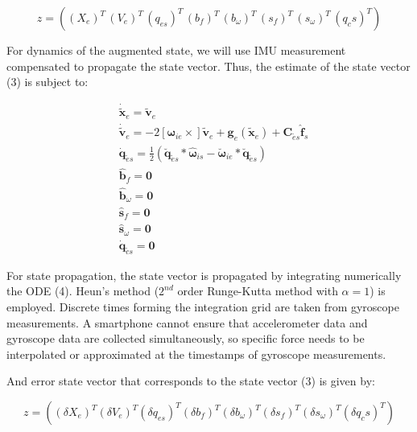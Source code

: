 \documentclass[conference]{IEEEtran}
\begin{document}
\begin{equation}
z = ((X_e)^T \, (V_e)^T \, (q_{es})^T \, (b_f)^T \, (b_{\omega})^T \, (s_f)^T \, (s_{\omega})^T \, (q_cs)^T)
\end{equation}

For dynamics of the augmented state, we will use IMU measurement compensated to propagate the state vector. Thus, the estimate of the state vector (3) is subject to:

\begin{equation}
\begin{aligned}
& \dot{\tilde{\mathbf{x}}}_e=\tilde{\mathbf{v}}_e \\
& \dot{\tilde{\mathbf{v}}}_e=-2\left[\boldsymbol{\omega}_{i e} \times\right] \tilde{\mathbf{v}}_e+\mathbf{g}_e\left(\tilde{\mathbf{x}}_e\right)+\mathbf{C}_{\tilde{e} s} \hat{\mathbf{f}}_s \\
& \dot{\mathbf{q}}_{\tilde{e} s}=\frac{1}{2}\left(\breve{\mathbf{q}}_{\tilde{e} s} * \widehat{\boldsymbol{\omega}}_{i s}-\breve{\boldsymbol{\omega}}_{i e} * \breve{\mathbf{q}}_{\tilde{e} s}\right) \\
& \hat{\mathbf{b}}_f=\mathbf{0} \\
& \hat{\mathbf{b}}_\omega=\mathbf{0} \\
& \hat{\mathbf{s}}_f=\mathbf{0} \\
& \hat{\mathbf{s}}_\omega=\mathbf{0} \\
& \dot{\mathbf{q}}_{\tilde{c} s}=\mathbf{0}
\end{aligned}
\end{equation}

For state propagation, the state vector is propagated by integrating numerically the ODE (4). Heun’s method ($2^{nd}$ order Runge-Kutta method with $\alpha = 1$) is employed. Discrete times forming the integration grid are taken from gyroscope measurements. A smartphone cannot ensure that accelerometer data and gyroscope data are collected simultaneously, so specific force needs to be interpolated or approximated at the timestamps of gyroscope measurements.

And error state vector that corresponds to the state vector (3) is given by:

\begin{equation}
z = ((\delta X_e)^T (\delta V_e)^T (\delta q_{es})^T (\delta b_f)^T (\delta b_{\omega})^T (\delta s_f)^T (\delta s_{\omega})^T (\delta q_cs)^T)
\end{equation}
\end{document}

